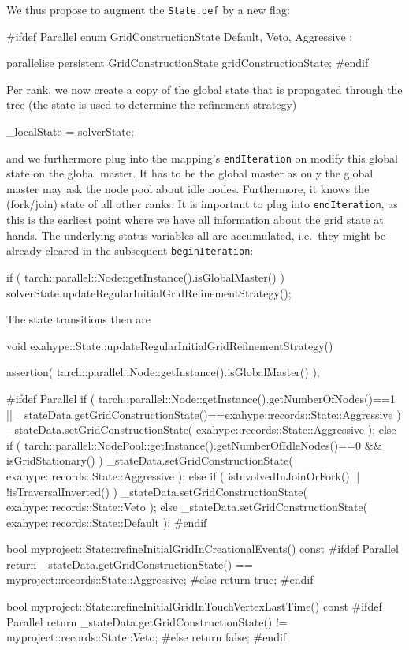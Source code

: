 We thus propose to augment the \texttt{State.def} by a new flag:
\begin{code}
  #ifdef Parallel
  enum GridConstructionState {
    Default, Veto, Aggressive
  };
  
  parallelise persistent GridConstructionState  gridConstructionState; 
  #endif
\end{code}

\noindent
Per rank, we now create a copy of the global state that is propagated through
the tree (the state is used to determine the refinement strategy)
\begin{code}
  _localState = solverState;
\end{code}

\noindent
and we furthermore plug into the mapping's \texttt{endIteration} on modify this
global state on the global master. 
It has to be the global master as only the global master may ask the node pool
about idle nodes. 
Furthermore, it knows the (fork/join) state of all other ranks.
It is important to plug into \texttt{endIteration}, as this is the earliest
point where we have all information about the grid state at hands. 
The underlying status variables all are accumulated, i.e.~they might be already
cleared in the subsequent \texttt{beginIteration}:
\begin{code}
  if ( tarch::parallel::Node::getInstance().isGlobalMaster() ) {
    solverState.updateRegularInitialGridRefinementStrategy();
  }
\end{code}

\noindent
The state transitions then are
\begin{code}
void exahype::State::updateRegularInitialGridRefinementStrategy() {
  assertion( tarch::parallel::Node::getInstance().isGlobalMaster() );

  #ifdef Parallel
  if (
    tarch::parallel::Node::getInstance().getNumberOfNodes()==1
    ||
    _stateData.getGridConstructionState()==exahype::records::State::Aggressive
  ) {
    _stateData.setGridConstructionState( exahype::records::State::Aggressive );
  }
  else if (
    tarch::parallel::NodePool::getInstance().getNumberOfIdleNodes()==0
    &&
    isGridStationary()
  ) {
    _stateData.setGridConstructionState( exahype::records::State::Aggressive );
  }
  else if (
    isInvolvedInJoinOrFork()
    ||
    !isTraversalInverted()
  ) {
    _stateData.setGridConstructionState( exahype::records::State::Veto );
  }
  else {
    _stateData.setGridConstructionState( exahype::records::State::Default );
  }
  #endif
}

bool myproject::State::refineInitialGridInCreationalEvents() const {
  #ifdef Parallel
  return _stateData.getGridConstructionState() == myproject::records::State::Aggressive;
  #else
  return true;
  #endif
}

bool myproject::State::refineInitialGridInTouchVertexLastTime() const {
  #ifdef Parallel
  return _stateData.getGridConstructionState() != myproject::records::State::Veto;
  #else
  return false;
  #endif
}
\end{code}

